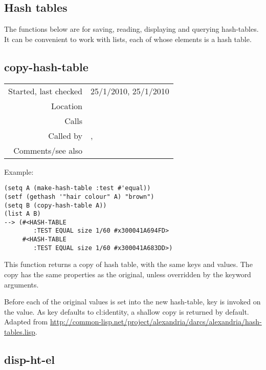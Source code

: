 \subsection{Hash tables}\label{sec:hash-tables}

The functions below are for saving, reading,
displaying and querying hash-tables. It can be
convenient to work with lists, each of whose elements
is a hash table.


\subsection*{copy-hash-table}\label{fun:copy-hash-table}

\vspace{0.3cm}
\begin{tabular}{r|p{8cm}}
Started, last checked & 25/1/2010, 25/1/2010 \\
Location & \nameref{sec:hash-tables} \\
Calls & \\
Called by & \nameref{fun:disp-ht-el}, \nameref{fun:disp-ht-key} \\
Comments/see also &
\end{tabular}

\vspace{0.5cm}
\noindent Example:
\begin{verbatim}
(setq A (make-hash-table :test #'equal))
(setf (gethash '"hair colour" A) "brown")
(setq B (copy-hash-table A))
(list A B)
--> (#<HASH-TABLE
        :TEST EQUAL size 1/60 #x300041A694FD>
     #<HASH-TABLE
        :TEST EQUAL size 1/60 #x300041A683DD>)
\end{verbatim}

\noindent This function returns a copy of hash table,
with the same keys and values. The copy has the same
properties as the original, unless overridden by the
keyword arguments.

Before each of the original values is set into the new
hash-table, key is invoked on the value. As key
defaults to cl:identity, a shallow copy is returned by
default. Adapted from \href{http://common-lisp.net/project/alexandria/darcs/alexandria/hash-tables.lisp}{http://common-lisp.net/project/alexandria/darcs\newline/alexandria/hash-tables.lisp}.


\subsection*{disp-ht-el}\label{fun:disp-ht-el}

